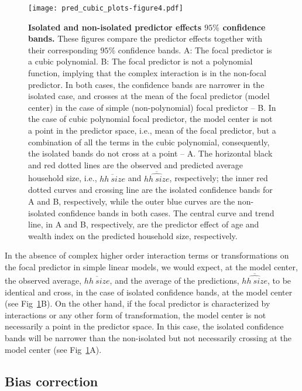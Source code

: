 \documentclass[10pt,letterpaper]{article}
\let\over=\overline
\begin{document}
\begin{figure}[!h]
\centering
\texttt{[image: pred\_cubic\_plots-figure4.pdf]}
\caption{{\bf Isolated and non-isolated predictor effects $95\%$ confidence bands.} These figures compare the predictor effects together with their corresponding $95\%$ confidence bands. A: The focal predictor is a cubic polynomial. B: The focal predictor is not a polynomial function, implying that the complex interaction is in the non-focal predictor. In both cases, the confidence bands are narrower in the isolated case, and crosses at the mean of the focal predictor (model center) in the case of simple (non-polynomial) focal predictor -- B. In the case of cubic polynomial focal predictor, the model center is not a point in the predictor space, i.e., mean of the focal predictor, but a combination of all the terms in the cubic polynomial, consequently, the isolated bands do not cross at a point -- A. The horizontal black and red dotted lines are the observed and predicted average household size, i.e., $\over{hh~size}$ and $\over{\widehat{hh~size}}$, respectively; the inner red dotted curves and crossing line are the isolated confidence bands for A and B, respectively, while the outer blue curves are the non-isolated confidence bands in both cases. The central curve and trend line, in A and B, respectively, are the predictor effect of age and wealth index on the predicted household size, respectively.}
\label{fig:pred_cubic_plots}
\end{figure}

In the absence of complex higher order interaction terms or transformations on the focal predictor in simple linear models, we would expect, at the model center, the observed average, $\over{hh~size}$, and the average of the predictions, $\over{\widehat{hh~size}}$, to be identical and cross, in the case of isolated confidence bands, at the model center (see Fig~\ref{fig:pred_cubic_plots}B). On the other hand, if the focal predictor is characterized by interactions or any other form of transformation, the model center is not necessarily a point in the predictor space. In this case, the isolated confidence bands will be narrower than the non-isolated but not necessarily crossing at the model center (see Fig~\ref{fig:pred_cubic_plots}A).

\subsection*{Bias correction}
\end{document}

